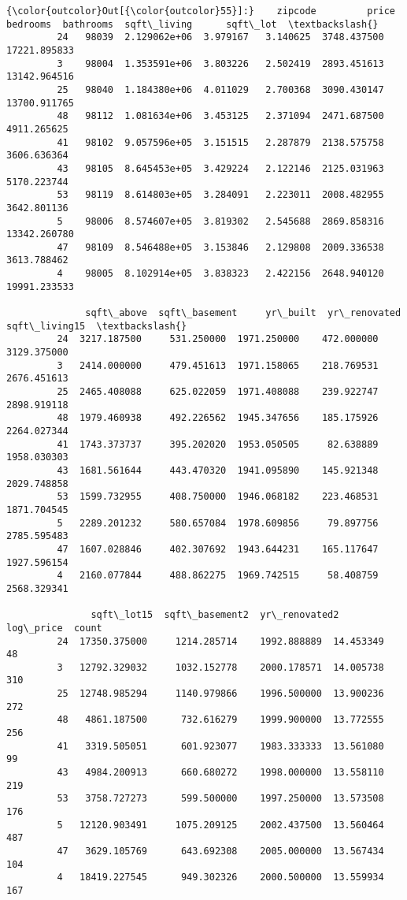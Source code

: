 \documentclass[11pt]{article}
\begin{document}
\begin{Verbatim}[commandchars=\\\{\}]
{\color{outcolor}Out[{\color{outcolor}55}]:}    zipcode         price  bedrooms  bathrooms  sqft\_living      sqft\_lot  \textbackslash{}
         24   98039  2.129062e+06  3.979167   3.140625  3748.437500  17221.895833   
         3    98004  1.353591e+06  3.803226   2.502419  2893.451613  13142.964516   
         25   98040  1.184380e+06  4.011029   2.700368  3090.430147  13700.911765   
         48   98112  1.081634e+06  3.453125   2.371094  2471.687500   4911.265625   
         41   98102  9.057596e+05  3.151515   2.287879  2138.575758   3606.636364   
         43   98105  8.645453e+05  3.429224   2.122146  2125.031963   5170.223744   
         53   98119  8.614803e+05  3.284091   2.223011  2008.482955   3642.801136   
         5    98006  8.574607e+05  3.819302   2.545688  2869.858316  13342.260780   
         47   98109  8.546488e+05  3.153846   2.129808  2009.336538   3613.788462   
         4    98005  8.102914e+05  3.838323   2.422156  2648.940120  19991.233533   
         
              sqft\_above  sqft\_basement     yr\_built  yr\_renovated  sqft\_living15  \textbackslash{}
         24  3217.187500     531.250000  1971.250000    472.000000    3129.375000   
         3   2414.000000     479.451613  1971.158065    218.769531    2676.451613   
         25  2465.408088     625.022059  1971.408088    239.922747    2898.919118   
         48  1979.460938     492.226562  1945.347656    185.175926    2264.027344   
         41  1743.373737     395.202020  1953.050505     82.638889    1958.030303   
         43  1681.561644     443.470320  1941.095890    145.921348    2029.748858   
         53  1599.732955     408.750000  1946.068182    223.468531    1871.704545   
         5   2289.201232     580.657084  1978.609856     79.897756    2785.595483   
         47  1607.028846     402.307692  1943.644231    165.117647    1927.596154   
         4   2160.077844     488.862275  1969.742515     58.408759    2568.329341   
         
               sqft\_lot15  sqft\_basement2  yr\_renovated2  log\_price  count  
         24  17350.375000     1214.285714    1992.888889  14.453349     48  
         3   12792.329032     1032.152778    2000.178571  14.005738    310  
         25  12748.985294     1140.979866    1996.500000  13.900236    272  
         48   4861.187500      732.616279    1999.900000  13.772555    256  
         41   3319.505051      601.923077    1983.333333  13.561080     99  
         43   4984.200913      660.680272    1998.000000  13.558110    219  
         53   3758.727273      599.500000    1997.250000  13.573508    176  
         5   12120.903491     1075.209125    2002.437500  13.560464    487  
         47   3629.105769      643.692308    2005.000000  13.567434    104  
         4   18419.227545      949.302326    2000.500000  13.559934    167  
\end{Verbatim}
            
\end{document}
